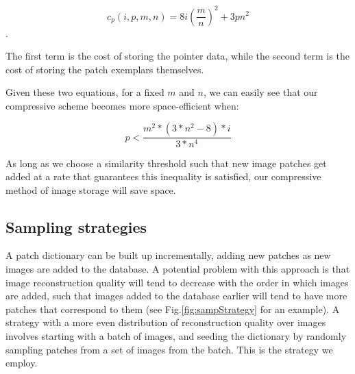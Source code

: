 \begin{equation}
	c_p(i, p, m, n) = 8 i (\frac{m}{n})^2 + 3  p  n^2
\end{equation}.

The first term is the cost of storing the pointer data, while the second term is the cost of storing the patch exemplars themselves.

Given these two equations, for a fixed $m$ and $n$, we can easily see that our compressive scheme becomes more space-efficient when:

\begin{equation}
	p < \frac{m^2 * (3*n^2 - 8) * i}{3*n^4}
\end{equation}

As long as we choose a similarity threshold such that new image patches get added at a rate that guarantees this inequality is satisfied, our compressive method of image storage will save space.

\subsection{Sampling strategies}

A patch dictionary can be built up incrementally, adding new patches as new images are added to the database. A potential problem with this approach is that image reconstruction quality will tend to decrease with the order in which images are added, such that images added to the database earlier will tend to have more patches that correspond to them (see Fig.\ref{fig:sampStrategy} for an example). A strategy with a more even distribution of reconstruction quality over images involves starting with a batch of images, and seeding the dictionary by randomly sampling patches from a set of images from the batch. This is the strategy we employ. 

